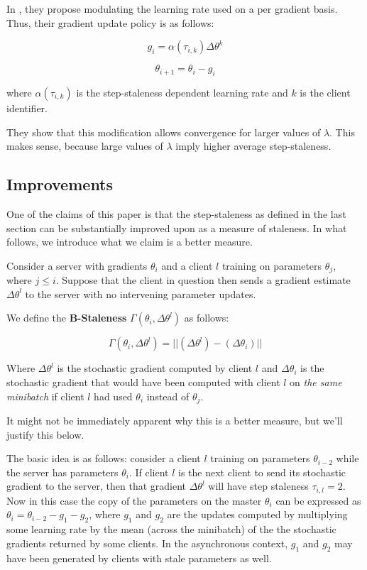 \documentclass{article} %
\begin{document}
In \cite{Suyog}, they propose modulating the learning rate used on a per gradient basis.
Thus, their gradient update policy is as follows:

\begin{equation}
  g_i = \alpha(\tau_{i,k})\Delta \theta^k
\end{equation}

\begin{equation}
   \theta_{i + 1} = \theta_{i} - g_i
\end{equation}

where $\alpha(\tau_{i,k})$ is the step-staleness dependent learning rate
and $k$ is the client identifier.

They show that this modification allows convergence for larger values of $\lambda$.
This makes sense, because large values of $\lambda$ imply higher average step-staleness.

\subsection{Improvements}

One of the claims of this paper is that the step-staleness as defined in the last section
can be substantially improved upon as a measure of staleness.
In what follows, we introduce what we claim is a better measure. 

Consider a server with gradients $\theta_{i}$ and a client $l$ training on parameters $\theta_{j}$,
where $j \leq i$. Suppose that the client in question then sends a gradient estimate $\Delta \theta^l$
to the server with no intervening parameter updates.

We define the \textbf{B-Staleness} $\Gamma(\theta_{i}, \Delta \theta^l)$ as follows:

\begin{equation}  \label{bdef}
  \Gamma(\theta_{i}, \Delta \theta^l) = || (\Delta \theta^l) - (\Delta \theta_i) ||
\end{equation}

Where $ \Delta \theta^l $ is the stochastic gradient computed by client $l$ and
$ \Delta \theta_i$ is the stochastic gradient that would have been computed with client
$l$ on \textit{the same minibatch} if client $l$ had used $\theta_i$ instead of $\theta_j$.

It might not be immediately apparent why this is a better measure, but we'll justify this below.

The basic idea is as follows: consider a client $l$ training on parameters $\theta_{i-2}$
while the server has parameters $\theta_{i}$.
If client $l$ is the next client to send its stochastic gradient to the server, then that
gradient $\Delta \theta^l$ will have step staleness $\tau_{i,l} = 2$.
Now in this case the copy of the parameters on the master $\theta_i$ can be expressed as $\theta_i = \theta_{i-2} - g_1 - g_2$,
where $g_1$ and $g_2$ are the updates computed by multiplying some learning rate by the mean (across the minibatch) of
the the stochastic gradients returned by some clients. In the asynchronous context, $g_1$ and $g_2$ may have been
generated by clients with stale parameters as well.
\end{document}
